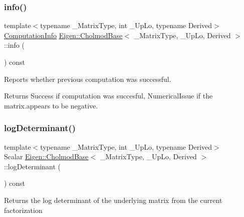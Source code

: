 \subsubsection{\texorpdfstring{info()}{info()}}
{\footnotesize\ttfamily template$<$typename \+\_\+\+Matrix\+Type, int \+\_\+\+Up\+Lo, typename Derived$>$ \\
\mbox{\hyperlink{group__enums_ga85fad7b87587764e5cf6b513a9e0ee5e}{Computation\+Info}} \mbox{\hyperlink{class_eigen_1_1_cholmod_base}{Eigen\+::\+Cholmod\+Base}}$<$ \+\_\+\+Matrix\+Type, \+\_\+\+Up\+Lo, Derived $>$\+::info (\begin{DoxyParamCaption}{ }\end{DoxyParamCaption}) const\hspace{0.3cm}{\ttfamily [inline]}}



Reports whether previous computation was successful. 

\begin{DoxyReturn}{Returns}
{\ttfamily Success} if computation was succesful, {\ttfamily Numerical\+Issue} if the matrix.\+appears to be negative. 
\end{DoxyReturn}
\mbox{\label{class_eigen_1_1_cholmod_base_a597f7839a39604af18a8741a0d8c46bf}} 
\subsubsection{\texorpdfstring{logDeterminant()}{logDeterminant()}}
{\footnotesize\ttfamily template$<$typename \+\_\+\+Matrix\+Type, int \+\_\+\+Up\+Lo, typename Derived$>$ \\
Scalar \mbox{\hyperlink{class_eigen_1_1_cholmod_base}{Eigen\+::\+Cholmod\+Base}}$<$ \+\_\+\+Matrix\+Type, \+\_\+\+Up\+Lo, Derived $>$\+::log\+Determinant (\begin{DoxyParamCaption}{ }\end{DoxyParamCaption}) const\hspace{0.3cm}{\ttfamily [inline]}}

\begin{DoxyReturn}{Returns}
the log determinant of the underlying matrix from the current factorization 
\end{DoxyReturn}
\mbox{\label{class_eigen_1_1_cholmod_base_a886fc102723ca7bde4ac7162dfd72f5d}} 
